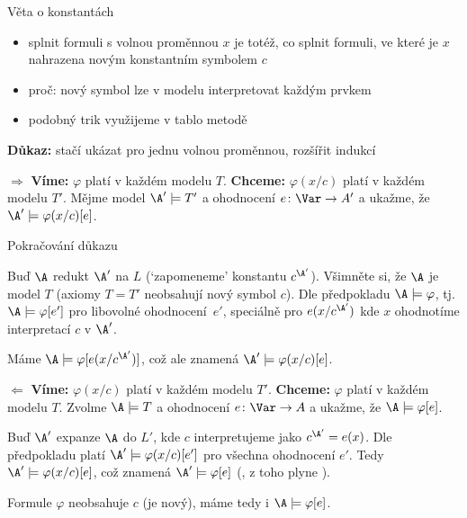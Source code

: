 \documentclass{beamer}
\begin{document}
\begin{frame}{Věta o konstantách}

    \pause
    \begin{itemize}
        \item splnit formuli s volnou proměnnou $x$ je totéž, co splnit formuli, ve které je $x$ nahrazena \alert{novým} konstantním symbolem $c$\pause
        \item proč: nový symbol lze v modelu interpretovat každým prvkem\pause
        \item podobný trik využijeme v tablo metodě\pause
    \end{itemize}


    \pause
    \textbf{Důkaz:} stačí ukázat pro jednu volnou proměnnou, rozšířit indukcí

    \pause
    \alert{\Large \bf $\Rightarrow$} \textbf{Víme:} $\varphi$ platí v každém modelu $T$. \textbf{Chceme:} $\varphi(x/c)$ platí v každém modelu $T'$. \pause Mějme model $\A'\models T'$ a ohodnocení $e\colon\Var\to A'$ a ukažme, že \alert{$\A'\models\varphi(x/c)[e]$}.

\end{frame}


\begin{frame}{Pokračování důkazu}

    Buď $\A$ redukt $\A'$ na $L$ (`zapomeneme' konstantu $c^{\A'}$). Všimněte si, že \alert{$\A$ je model $T$} (axiomy $T=T'$ neobsahují \alert{nový} symbol $c$). \pause Dle předpokladu $\A\models\varphi$, tj. $\A\models\varphi[e']$ pro \alert{libovolné} ohodnocení~$e'$, speciálně pro $e(x/c^{\A'})$ kde $x$ ohodnotíme  interpretací $c$ v $\A'$.
    
    \pause 
    Máme $\A\models\varphi[e(x/c^{\A'})]$, což ale znamená $\A'\models\varphi(x/c)[e]$.
    
    \pause 
    \alert{\Large \bf $\Leftarrow$} \textbf{Víme:} $\varphi(x/c)$ platí v každém modelu $T'$. \textbf{Chceme:} $\varphi$ platí v každém modelu $T$. \pause Zvolme $\A\models T$ a ohodnocení $e\colon\Var\to A$ a ukažme, že \alert{$\A\models\varphi[e]$}.

    \pause 
    Buď $\A'$ expanze $\A$ do $L'$, kde $c$ interpretujeme jako $c^{\A'}=e(x)$. \pause Dle předpokladu platí $\A'\models\varphi(x/c)[e']$ pro všechna ohodnocení $e'$. \pause Tedy $\A'\models\varphi(x/c)[e]$, což znamená \alert{$\A'\models\varphi[e]$} (, z toho plyne ).
    
    \pause 
    Formule $\varphi$ neobsahuje $c$ (je \alert{nový}), máme tedy i $\A\models\varphi[e]$. \hfill\qedsymbol
    
\end{frame}
\end{document}
